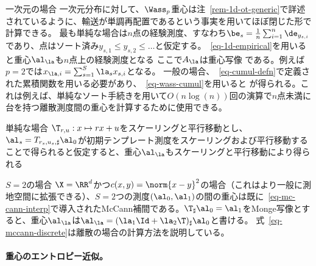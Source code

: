 \begin{rem1}{一次元の場合}\label{rem-bary-1d}
	一次元分布に対して、$\Wass_p$重心は注~\ref{rem-1d-ot-generic}で詳述されているように、輸送が単調再配置であるという事実を用いてほぼ閉じた形で計算できる。
	最も単純な場合は$n$点の経験測度、すなわち$\be_s = \frac{1}{n}\sum_{i=1}^n \de_{y_{s,i}}$であり、点はソート済み$y_{s,1} \leq y_{s,2} \leq \ldots$と仮定する。~\eqref{eq-1d-empirical}を用いると重心$\al_\la$も$n$点上の経験測度となる
	ここで$A_\la$は重心写像
	である。例えば$p=2$では$x_{\la,i} = \sum_{s=1}^S \la_s x_{s,i}$となる。
	一般の場合、~\eqref{eq-cumul-defn}で定義された累積関数を用いる必要があり、~\eqref{eq-wass-cumul}を用いると
	が得られる。これは例えば、単純なソート手続きを用いて$O(n\log(n))$回の演算で$n$点未満に台を持つ離散測度間の重心を計算するために使用できる。
\end{rem1}



\begin{rem1}{単純な場合}
	$\T_{r,u} : x \mapsto rx+u$をスケーリングと平行移動とし、$\al_{s} = T_{r_s,u_s,\sharp} \al_0$が初期テンプレート測度をスケーリングおよび平行移動することで得られると仮定すると、重心$\al_\la$もスケーリングと平行移動により得られる
\end{rem1}


\begin{rem1}{$S=2$の場合}
	$\X=\RR^d$かつ$c(x,y)=\norm{x-y}^2$の場合（これはより一般に測地空間に拡張できる）、$S=2$つの測度$(\al_0,\al_1)$の間の重心は既に~\eqref{eq-mc-cann-interp}で導入されたMcCann補間である。$\T_\sharp \al_0=\al_1$をMonge写像とすると、重心$\al_\la$は$\al_\la = (\la_1 \Id + \la_2 \T)_{\sharp} \al_0$と書ける。
	式~\eqref{eq-mccann-discrete}は離散の場合の計算方法を説明している。
\end{rem1}



\paragraph{重心のエントロピー近似。}

